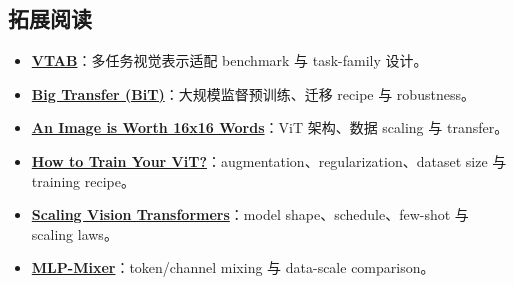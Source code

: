 \documentclass[a4paper]{article}
\begin{document}
\subsection{拓展阅读}

{\small
\begin{itemize}[nosep,leftmargin=*]
  \item \href{https://arxiv.org/abs/1910.04867}{\textbf{VTAB}}：多任务视觉表示适配 benchmark 与 task-family 设计。
  \item \href{https://arxiv.org/abs/1912.11370}{\textbf{Big Transfer (BiT)}}：大规模监督预训练、迁移 recipe 与 robustness。
  \item \href{https://arxiv.org/abs/2010.11929}{\textbf{An Image is Worth 16x16 Words}}：ViT 架构、数据 scaling 与 transfer。
  \item \href{https://arxiv.org/abs/2106.10270}{\textbf{How to Train Your ViT?}}：augmentation、regularization、dataset size 与 training recipe。
  \item \href{https://arxiv.org/abs/2106.04560}{\textbf{Scaling Vision Transformers}}：model shape、schedule、few-shot 与 scaling laws。
  \item \href{https://arxiv.org/abs/2105.01601}{\textbf{MLP-Mixer}}：token/channel mixing 与 data-scale comparison。
\end{itemize}
}
\end{document}
